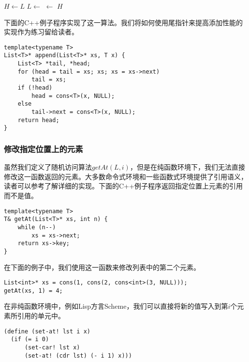 \documentclass[UTF8]{article}
\begin{document}
\begin{algorithmic}[1]
    \State \Return {}
  \EndIf
  \State $H \gets L$
    \State $L \gets$ 
  \EndWhile
  \State {} $\gets$ 
  \State \Return $H$
\EndFunction
\end{algorithmic}

下面的C++例子程序实现了这一算法。我们将如何使用尾指针来提高添加性能的实现作为练习留给读者。

\lstset{language=C++}
\begin{lstlisting}
template<typename T>
List<T>* append(List<T>* xs, T x) {
    List<T> *tail, *head;
    for (head = tail = xs; xs; xs = xs->next)
        tail = xs;
    if (!head)
        head = cons<T>(x, NULL);
    else
        tail->next = cons<T>(x, NULL);
    return head;
}
\end{lstlisting}

\subsubsection{修改指定位置上的元素}

虽然我们定义了随机访问算法$getAt(L, i)$，但是在纯函数环境下，我们无法直接修改这一函数返回的元素。大多数命令式环境和一些函数式环境提供了引用语义，读者可以参考\cite{mittype}了解详细的实现。下面的C++例子程序返回指定位置上元素的引用而不是值。

\lstset{language=C++}
\begin{lstlisting}
template<typename T>
T& getAt(List<T>* xs, int n) {
    while (n--)
        xs = xs->next;
    return xs->key;
}
\end{lstlisting}

在下面的例子中，我们使用这一函数来修改列表中的第二个元素。

\begin{lstlisting}
List<int>* xs = cons(1, cons(2, cons<int>(3, NULL)));
getAt(xs, 1) = 4;
\end{lstlisting}

在非纯函数环境中，例如Lisp方言Scheme，我们可以直接将新的值写入到第$i$个元素所引用的单元中。

\lstset{language=Lisp}
\begin{lstlisting}
(define (set-at! lst i x)
  (if (= i 0)
      (set-car! lst x)
      (set-at! (cdr lst) (- i 1) x)))
\end{lstlisting}
\end{document}
